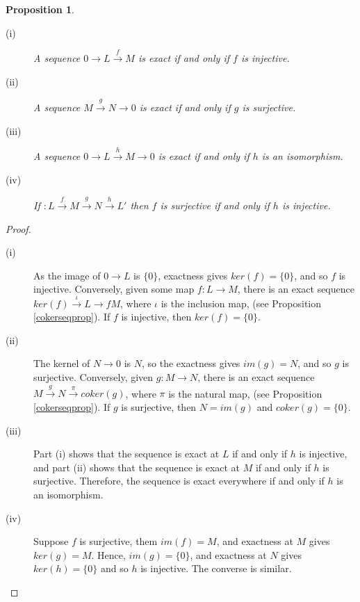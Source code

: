 \documentclass[11.5pt, twoside, a4paper, titlepage]{report}
\theoremstyle{definition}
\theoremstyle{plain}
\newtheorem{prop}[mydef]{Proposition}
\begin{document}
\begin{prop} \label{exactpropertiesprop}
\begin{description}
\item[(i)] A sequence $0\xrightarrow{}L\xrightarrow{f}M$ is exact if and only if $f$ is injective.
\item[(ii)] A sequence $M\xrightarrow{g}N\xrightarrow{}0$ is exact if and only if $g$ is surjective.
\item[(iii)] A sequence $0\xrightarrow{}L\xrightarrow{h}M\xrightarrow{}0$ is exact if and only if $h$ is an isomorphism.
\item[(iv)] If $:L\xrightarrow{f} M \xrightarrow{g}N\xrightarrow{h}L'$ then $f$ is surjective if and only if $h$ is injective.
\end{description}
\end{prop}
\begin{proof}
\begin{description}
\item[(i)] As the image of $0\xrightarrow{}L$ is $\{0\}$, exactness gives $ker(f)=\{0\}$, and so $f$ is injective. Conversely, given some map $f:L\to M$, there is an exact sequence $ker(f)\xrightarrow{\iota}L\rightarrow{f}M$, where $\iota$ is the inclusion map, (see Proposition \ref{cokerseqprop}). If $f$ is injective, then $ker(f)=\{0\}$.
\item[(ii)] The kernel of $N\xrightarrow{}0$ is $N$, so the exactness gives $im(g)=N$, and so $g$ is surjective. Conversely, given $g:M\to N$, there is an exact sequence $M\xrightarrow{g}N\xrightarrow{\pi}coker(g)$, where $\pi$ is the natural map, (see Proposition \ref{cokerseqprop}). If $g$ is surjective, then $N=im(g)$ and $coker(g)=\{0\}$.
\item[(iii)] Part (i) shows that the sequence is exact at $L$ if and only if $h$ is injective, and part (ii) shows that the sequence is exact at $M$ if and only if $h$ is surjective. Therefore, the sequence is exact everywhere if and only if $h$ is an isomorphism.
\item[(iv)] Suppose $f$ is surjective, them $im(f)=M$, and exactness at $M$ gives $ker(g)=M$. Hence, $im(g)=\{0\}$, and exactness at $N$ gives $ker(h)=\{0\}$ and so $h$ is injective. The converse is similar.
\end{description}
\end{proof}
\end{document}
